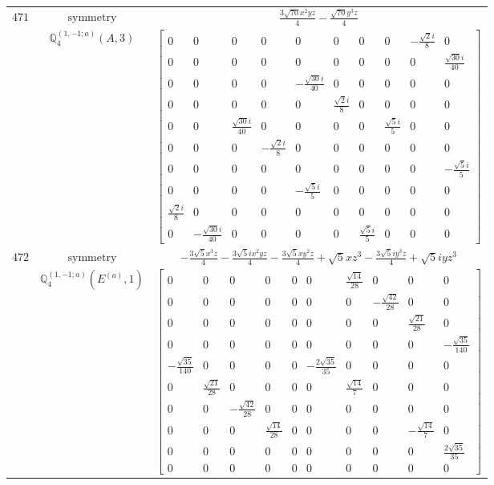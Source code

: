 \documentclass[fleqn,8pt,landscape]{jsarticle}
\begin{document}
\begin{longtable}{ccc}
$ 471 $ & $ \text{symmetry} $ & $ \frac{3 \sqrt{70} x^{2} y z}{4} - \frac{\sqrt{70} y^{3} z}{4} $ \\
$  $ & $ \mathbb{Q}_{4}^{(1,-1;a)}(A,3) $ & $ \begin{bmatrix} 0 & 0 & 0 & 0 & 0 & 0 & 0 & 0 & - \frac{\sqrt{2} i}{8} & 0 \\ 0 & 0 & 0 & 0 & 0 & 0 & 0 & 0 & 0 & \frac{\sqrt{30} i}{40} \\ 0 & 0 & 0 & 0 & - \frac{\sqrt{30} i}{40} & 0 & 0 & 0 & 0 & 0 \\ 0 & 0 & 0 & 0 & 0 & \frac{\sqrt{2} i}{8} & 0 & 0 & 0 & 0 \\ 0 & 0 & \frac{\sqrt{30} i}{40} & 0 & 0 & 0 & 0 & \frac{\sqrt{5} i}{5} & 0 & 0 \\ 0 & 0 & 0 & - \frac{\sqrt{2} i}{8} & 0 & 0 & 0 & 0 & 0 & 0 \\ 0 & 0 & 0 & 0 & 0 & 0 & 0 & 0 & 0 & - \frac{\sqrt{5} i}{5} \\ 0 & 0 & 0 & 0 & - \frac{\sqrt{5} i}{5} & 0 & 0 & 0 & 0 & 0 \\ \frac{\sqrt{2} i}{8} & 0 & 0 & 0 & 0 & 0 & 0 & 0 & 0 & 0 \\ 0 & - \frac{\sqrt{30} i}{40} & 0 & 0 & 0 & 0 & \frac{\sqrt{5} i}{5} & 0 & 0 & 0 \end{bmatrix} $ \\ \hline
$ 472 $ & $ \text{symmetry} $ & $ - \frac{3 \sqrt{5} x^{3} z}{4} - \frac{3 \sqrt{5} i x^{2} y z}{4} - \frac{3 \sqrt{5} x y^{2} z}{4} + \sqrt{5} x z^{3} - \frac{3 \sqrt{5} i y^{3} z}{4} + \sqrt{5} i y z^{3} $ \\
$  $ & $ \mathbb{Q}_{4}^{(1,-1;a)}(E^{(a)},1) $ & $ \begin{bmatrix} 0 & 0 & 0 & 0 & 0 & 0 & \frac{\sqrt{14}}{28} & 0 & 0 & 0 \\ 0 & 0 & 0 & 0 & 0 & 0 & 0 & - \frac{\sqrt{42}}{28} & 0 & 0 \\ 0 & 0 & 0 & 0 & 0 & 0 & 0 & 0 & \frac{\sqrt{21}}{28} & 0 \\ 0 & 0 & 0 & 0 & 0 & 0 & 0 & 0 & 0 & - \frac{\sqrt{35}}{140} \\ - \frac{\sqrt{35}}{140} & 0 & 0 & 0 & 0 & - \frac{2 \sqrt{35}}{35} & 0 & 0 & 0 & 0 \\ 0 & \frac{\sqrt{21}}{28} & 0 & 0 & 0 & 0 & \frac{\sqrt{14}}{7} & 0 & 0 & 0 \\ 0 & 0 & - \frac{\sqrt{42}}{28} & 0 & 0 & 0 & 0 & 0 & 0 & 0 \\ 0 & 0 & 0 & \frac{\sqrt{14}}{28} & 0 & 0 & 0 & 0 & - \frac{\sqrt{14}}{7} & 0 \\ 0 & 0 & 0 & 0 & 0 & 0 & 0 & 0 & 0 & \frac{2 \sqrt{35}}{35} \\ 0 & 0 & 0 & 0 & 0 & 0 & 0 & 0 & 0 & 0 \end{bmatrix} $ \\ \hline

\end{longtable}
\end{document}
